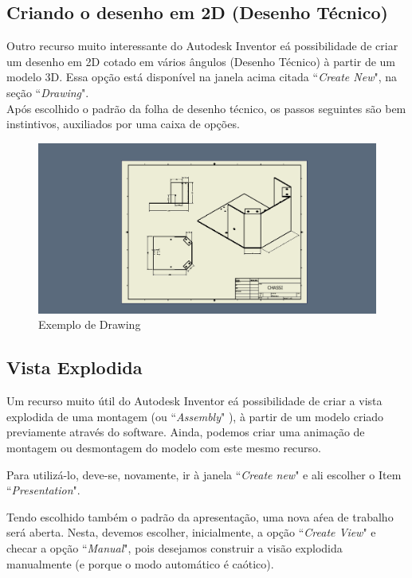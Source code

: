 \subsection{Criando o desenho em 2D (Desenho T\'ecnico)}

	Outro recurso muito interessante do Autodesk Inventor e\' a possibilidade de criar um desenho em 2D cotado em v\'arios \^angulos (Desenho T\'ecnico) \`a partir de um modelo 3D. Essa op\c{c}\~ao est\'a dispon\'ivel na janela acima citada ``{\it Create New}", na se\c{c}\~ao ``{\it Drawing}". 
	\\
	Ap\'os escolhido o padr\~ao da folha de desenho t\'ecnico, os passos seguintes s\~ao bem instintivos, auxiliados por uma caixa de op\c{c}\~oes.
	
	\begin{figure}[h]
	\includegraphics[scale=0.5]{./include/chapters/sections/mec/section1/imgs/chassi.png}
	\caption{Exemplo de Drawing}
	\label{Chassi}
	\end{figure}
\newpage
\subsection{Vista Explodida}

	Um recurso muito \'util do Autodesk Inventor e\' a possibilidade de criar a vista explodida de uma montagem (ou ``{\it Assembly}" ), \`a partir de um modelo criado previamente atrav\'es do software. Ainda, podemos criar uma anima\c{c}\~ao de montagem ou desmontagem do modelo com este mesmo recurso.
	
	Para utiliz\'a-lo, deve-se, novamente, ir \`a janela ``\textit{Create new}" e ali escolher o Item ``\textit{Presentation}".
	
	Tendo escolhido tamb\'em o padr\~ao da apresentaç\~ao, uma nova a\'rea de trabalho ser\'a aberta. Nesta, devemos escolher, inicialmente, a op\c{c}\~ao ``\textit {Create View}"  e checar a op\c{c}\~ao ``\textit {Manual}", pois desejamos construir a vis\~ao explodida manualmente (e porque o modo autom\'atico \'e ca\'otico).
	
